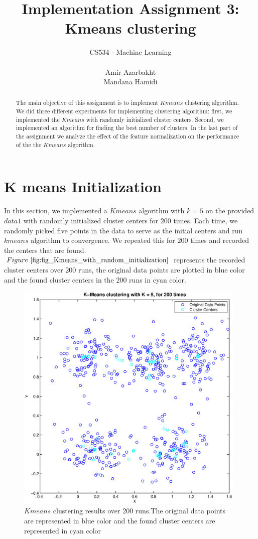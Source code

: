 \documentclass{article} %
\title{\Large{\textbf{ Implementation  Assignment 3: Kmeans clustering }}}
\author{CS534 - Machine Learning \\
\\
Amir Azarbakht\\
Mandana Hamidi\\
}
\begin{document}
\maketitle
\begin{abstract}
The main objective of this assignment is to implement $Kmeans$ clustering algorithm. We did three different experiments for implementing clustering algorithm: first, we implemented the $Kmeans$ with randomly initialized cluster centers. Second, we implemented an algorithm for finding the best number of clusters. In the last part of the assignment we analyze the effect of the feature normalization on the performance of the the $Kmeans$ algorithm.
\end{abstract}

\section{K means Initialization }
In this section, we implemented  a $Kmeans$ algorithm with $k = 5$ on the provided $data1$ with randomly initialized cluster centers for $200$ times. Each time, we randomly picked five points in the data to serve as the initial centers and run $kmeans$ algorithm to convergence. We repeated this for $200$ times and recorded the centers that are found.\\
$Figure~\ref{fig:fig_Kmeans_with_random_initialization}$  represents the recorded cluster centers over $200$ runs, the original data points are plotted in blue color and the found cluster centers in the $200$ runs in  cyan color. \\
\begin{figure}[h]
\begin{center}
\includegraphics[width=11cm]{Fig/fig_Kmeans_with_random_initialization.eps}
 \end{center}
\caption{\small{$Kmeans$ clustering results over 200 runs.The original data points are represented in blue color and the found cluster centers are represented in cyan color}} 
\label{fig:fig_Kmeans_with_random_initialization}
\end{figure}
\end{document}
